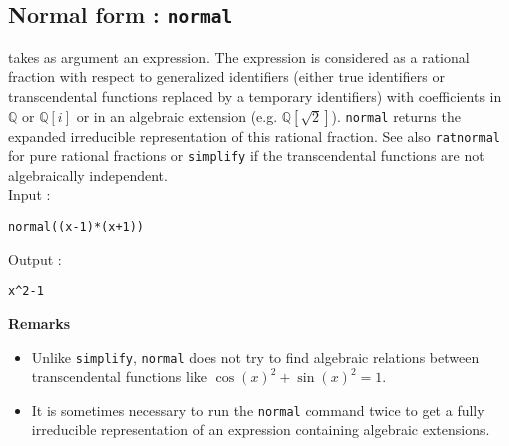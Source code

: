 \documentclass[a4paper,11pt]{book}
\begin{document}
\subsection{Normal form : {\tt normal}}
 takes as argument an expression. 
The expression is considered as a rational fraction with respect 
to generalized identifiers
(either true identifiers or transcendental functions replaced by 
a temporary identifiers) with coefficients in $\mathbb Q$ or $\mathbb Q[i]$
or in an algebraic extension (e.g. $\mathbb Q[\sqrt{2}]$).
{\tt normal} returns the expanded irreducible representation
of this rational fraction. See also {\tt ratnormal} for pure rational
fractions or {\tt simplify} if the transcendental functions are
not algebraically independent.\\
Input :  
\begin{center}{\tt normal((x-1)*(x+1))}\end{center}
Output :
 \begin{center}{\tt x\verb|^|2-1}\end{center}  
{\bf Remarks}
\begin{itemize}
\item Unlike {\tt simplify},
{\tt normal} does not try to find algebraic relations between
transcendental functions like $\cos(x)^2+\sin(x)^2=1$.
\item
It is sometimes necessary to run the {\tt normal} command twice to
get a fully irreducible representation of an expression
containing algebraic extensions.
\end{itemize}
\end{document}
